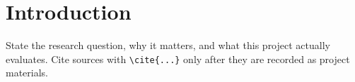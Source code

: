 \section{Introduction}
\label{sec:introduction}
State the research question, why it matters, and what this project actually evaluates. Cite
sources with \texttt{\textbackslash cite\{...\}} only after they are recorded as project materials.
